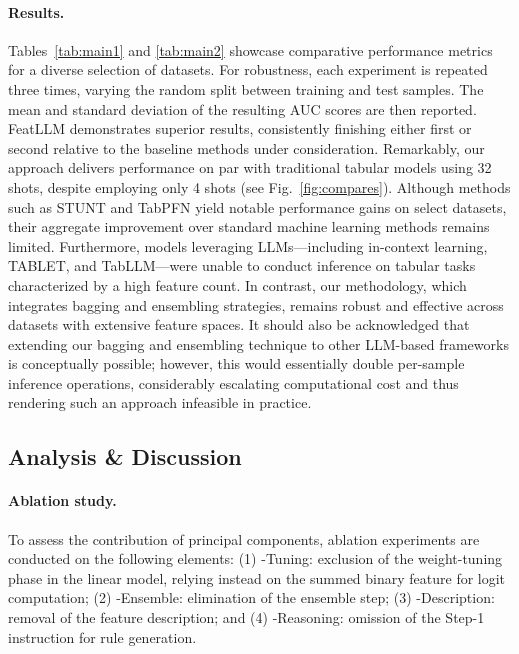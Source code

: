 \vspace*{-0.12in}
\paragraph{Results.}
Tables~\ref{tab:main1} and \ref{tab:main2} showcase comparative performance metrics for a diverse selection of datasets. For robustness, each experiment is repeated three times, varying the random split between training and test samples. The mean and standard deviation of the resulting AUC scores are then reported. \textsf{FeatLLM} demonstrates superior results, consistently finishing either first or second relative to the baseline methods under consideration. Remarkably, our approach delivers performance on par with traditional tabular models using 32 shots, despite employing only 4 shots (see Fig.~\ref{fig:compares}). Although methods such as STUNT and TabPFN yield notable performance gains on select datasets, their aggregate improvement over standard machine learning methods remains limited. Furthermore, models leveraging LLMs—including in-context learning, TABLET, and TabLLM—were unable to conduct inference on tabular tasks characterized by a high feature count. In contrast, our methodology, which integrates bagging and ensembling strategies, remains robust and effective across datasets with extensive feature spaces. It should also be acknowledged that extending our bagging and ensembling technique to other LLM-based frameworks is conceptually possible; however, this would essentially double per-sample inference operations, considerably escalating computational cost and thus rendering such an approach infeasible in practice.

\subsection{Analysis \& Discussion}
\label{sec:analysis}
\paragraph{Ablation study.} To assess the contribution of principal components, ablation experiments are conducted on the following elements: (1) \textsf{-Tuning}: exclusion of the weight-tuning phase in the linear model, relying instead on the summed binary feature for logit computation; (2) \textsf{-Ensemble}: elimination of the ensemble step; (3) \textsf{-Description}: removal of the feature description; and (4) \textsf{-Reasoning}: omission of the Step-1 instruction for rule generation.


